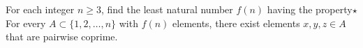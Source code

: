 For each integer $n\geq 3$,  find the least natural number $f(n)$ having the property$\star$ For every $A \subset \{1, 2, \ldots, n\}$ with $f(n)$ elements, there exist elements $x, y, z \in A$ that are pairwise coprime.